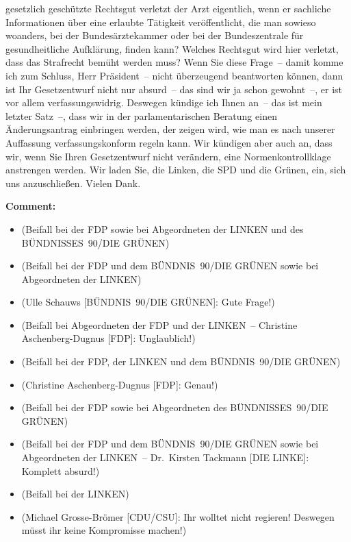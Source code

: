 \documentclass{article}
\begin{document}
gesetzlich geschützte Rechtsgut verletzt der Arzt eigentlich, wenn er sachliche Informationen über eine erlaubte Tätigkeit veröffentlicht, die man sowieso woanders, bei der Bundesärztekammer oder bei der Bundeszentrale für gesundheitliche Aufklärung, finden kann? Welches Rechtsgut wird hier verletzt, dass das Strafrecht bemüht werden muss?  Wenn Sie diese Frage – damit komme ich zum Schluss, Herr Präsident – nicht überzeugend beantworten können, dann ist Ihr Gesetzentwurf nicht nur absurd – das sind wir ja schon gewohnt –, er ist vor allem verfassungswidrig.  Deswegen kündige ich Ihnen an – das ist mein letzter Satz –, dass wir in der parlamentarischen Beratung einen Änderungsantrag einbringen werden, der zeigen wird, wie man es nach unserer Auffassung verfassungskonform regeln kann. Wir kündigen aber auch an, dass wir, wenn Sie Ihren Gesetzentwurf nicht verändern, eine Normenkontrollklage anstrengen werden. Wir laden Sie, die Linken, die SPD und die Grünen, ein, sich uns anzuschließen. Vielen Dank.  

\noindent\textbf{Comment:}
\begin{itemize}
    \setlength\itemsep{-3pt}
    \item (Beifall bei der FDP sowie bei Abgeordneten der LINKEN und des BÜNDNISSES 90/DIE GRÜNEN)
    \setlength\itemsep{-3pt}
    \item (Beifall bei der FDP und dem BÜNDNIS 90/DIE GRÜNEN sowie bei Abgeordneten der LINKEN)
    \setlength\itemsep{-3pt}
    \item (Ulle Schauws [BÜNDNIS 90/DIE GRÜNEN]: Gute Frage!)
    \setlength\itemsep{-3pt}
    \item (Beifall bei Abgeordneten der FDP und der LINKEN – Christine Aschenberg-Dugnus [FDP]: Unglaublich!)
    \setlength\itemsep{-3pt}
    \item (Beifall bei der FDP, der LINKEN und dem BÜNDNIS 90/DIE GRÜNEN)
    \setlength\itemsep{-3pt}
    \item (Christine Aschenberg-Dugnus [FDP]: Genau!)
    \setlength\itemsep{-3pt}
    \item (Beifall bei der FDP sowie bei Abgeordneten des BÜNDNISSES 90/DIE GRÜNEN)
    \setlength\itemsep{-3pt}
    \item (Beifall bei der FDP und dem BÜNDNIS 90/DIE GRÜNEN sowie bei Abgeordneten der LINKEN – Dr. Kirsten Tackmann [DIE LINKE]: Komplett absurd!)
    \setlength\itemsep{-3pt}
    \item (Beifall bei der LINKEN)
    \setlength\itemsep{-3pt}
    \item (Michael Grosse-Brömer [CDU/CSU]: Ihr wolltet nicht regieren! Deswegen müsst ihr keine Kompromisse machen!)
\end{itemize}
\end{document}
